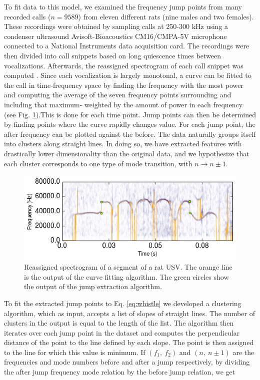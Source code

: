 \documentclass[superscriptaddress, twocolumn, prl]{revtex4}
\begin{document}
To fit data to this model, we examined the frequency jump points from many recorded calls ($n=9589$) from eleven different rats (nine males and two females). These recordings were obtained by sampling calls at 250-300 kHz using a condenser ultrasound Avisoft-Bioacoustics CM16/CMPA-5V microphone connected to a National Instruments data acquisition card. The recordings were then divided into call snippets based on long quiescence times between vocalizations. Afterwards, the reassigned spectrogram of each call snippet was computed \cite{Gardner2006}. Since each vocalization is largely monotonal, a curve can be fitted to the call in time-frequency space by finding the frequency with the most power and computing the average of the seven frequency points surrounding and including that maximum- weighted by the amount of power in each frequency (see Fig. \ref{fig:specgram}).This is done for each time point. Jump points can then be determined by finding points where the curve rapidly changes value. For each jump point, the after frequency can be plotted against the before. The data naturally groups itself into clusters along straight lines. In doing so, we have extracted features with drastically lower dimensionality than the original data, and we hypothesize that each cluster corresponds to one type of mode transition, with $n\rightarrow n\pm1$. 
\begin{figure}[!ht]
\centering
\includegraphics[width=\columnwidth]{specgram.png}
\caption{\label{fig:specgram} Reassigned spectrogram of a segment of a rat USV. The orange line is the output of the curve fitting algorithm. The green circles show the output of the jump extraction algorithm.}
\end{figure}
To fit the extracted jump points to Eq. \ref{eq:whistle} we developed a clustering algorithm, which as input, accepts a list of slopes of straight lines. The number of clusters in the output is equal to the length of the list. The algorithm then iterates over each jump point in the dataset and computes the perpendicular distance of the point to the line defined by each slope. The point is then assigned to the line for which this value is minimum. If $\left(f_{1},\: f_{2}\right)$ and $\left(n,\: n\pm1\right)$ are the frequencies and mode numbers before and after a jump respectively, by dividing the after jump frequency mode relation by the before jump relation, we get 
\end{document}
